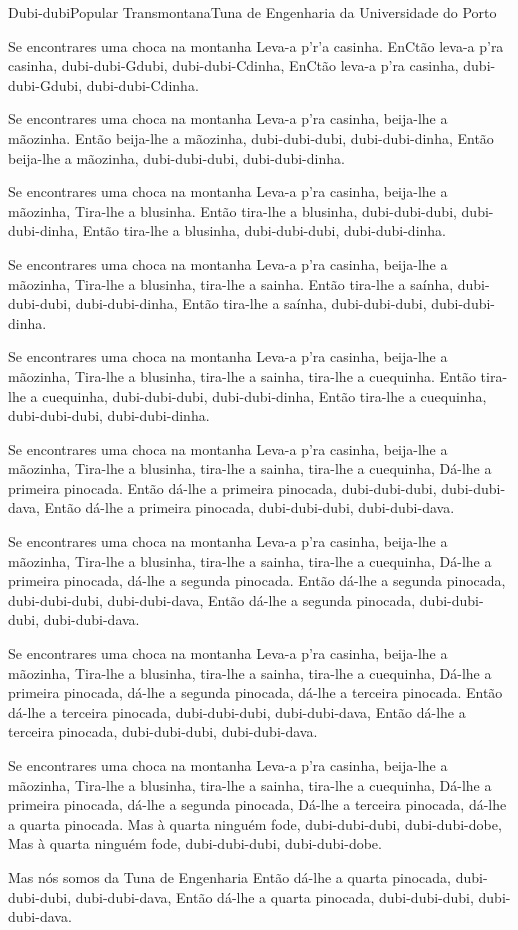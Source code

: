 \begin{musica}{Dubi-dubi}{Popular Transmontana}{Tuna de Engenharia da Universidade do Porto}

Se encontrares uma choca na montanha
Leva-a p'r'a casinha.
En\ac{C}{tão} leva-a p'ra casinha, dubi-dubi-\ac{G}{du}bi, dubi-dubi-\ac{C}{di}nha,
En\ac{C}{tão} leva-a p'ra casinha, dubi-dubi-\ac{G}{du}bi, dubi-dubi-\ac{C}{di}nha.

Se encontrares uma choca na montanha
Leva-a p'ra casinha, beija-lhe a mãozinha.
Então beija-lhe a mãozinha, dubi-dubi-dubi, dubi-dubi-dinha,
Então beija-lhe a mãozinha, dubi-dubi-dubi, dubi-dubi-dinha.

Se encontrares uma choca na montanha
Leva-a p'ra casinha, beija-lhe a mãozinha,
Tira-lhe a blusinha.
Então tira-lhe a blusinha, dubi-dubi-dubi, dubi-dubi-dinha,
Então tira-lhe a blusinha, dubi-dubi-dubi, dubi-dubi-dinha.

Se encontrares uma choca na montanha
Leva-a p'ra casinha, beija-lhe a mãozinha,
Tira-lhe a blusinha, tira-lhe a sainha.
Então tira-lhe a saínha, dubi-dubi-dubi, dubi-dubi-dinha,
Então tira-lhe a saínha, dubi-dubi-dubi, dubi-dubi-dinha.

Se encontrares uma choca na montanha
Leva-a p'ra casinha, beija-lhe a mãozinha,
Tira-lhe a blusinha, tira-lhe a sainha, tira-lhe a cuequinha.
Então tira-lhe a cuequinha, dubi-dubi-dubi, dubi-dubi-dinha,
Então tira-lhe a cuequinha, dubi-dubi-dubi, dubi-dubi-dinha.

Se encontrares uma choca na montanha
Leva-a p'ra casinha, beija-lhe a mãozinha,
Tira-lhe a blusinha, tira-lhe a sainha, tira-lhe a cuequinha,
Dá-lhe a primeira pinocada.
Então dá-lhe a primeira pinocada, dubi-dubi-dubi, dubi-dubi-dava,
Então dá-lhe a primeira pinocada, dubi-dubi-dubi, dubi-dubi-dava.

Se encontrares uma choca na montanha
Leva-a p'ra casinha, beija-lhe a mãozinha,
Tira-lhe a blusinha, tira-lhe a sainha, tira-lhe a cuequinha,
Dá-lhe a primeira pinocada, dá-lhe a segunda pinocada.
Então dá-lhe a segunda pinocada, dubi-dubi-dubi, dubi-dubi-dava,
Então dá-lhe a segunda pinocada, dubi-dubi-dubi, dubi-dubi-dava.

Se encontrares uma choca na montanha
Leva-a p'ra casinha, beija-lhe a mãozinha,
Tira-lhe a blusinha, tira-lhe a sainha, tira-lhe a cuequinha,
Dá-lhe a primeira pinocada, dá-lhe a segunda pinocada, dá-lhe a terceira pinocada.
Então dá-lhe a terceira pinocada, dubi-dubi-dubi, dubi-dubi-dava,
Então dá-lhe a terceira pinocada, dubi-dubi-dubi, dubi-dubi-dava.

Se encontrares uma choca na montanha
Leva-a p'ra casinha, beija-lhe a mãozinha,
Tira-lhe a blusinha, tira-lhe a sainha, tira-lhe a cuequinha,
Dá-lhe a primeira pinocada, dá-lhe a segunda pinocada,
Dá-lhe a terceira pinocada, dá-lhe a quarta pinocada.
Mas à quarta ninguém fode, dubi-dubi-dubi, dubi-dubi-dobe,
Mas à quarta ninguém fode, dubi-dubi-dubi, dubi-dubi-dobe.

Mas nós somos da Tuna de Engenharia
Então dá-lhe a quarta pinocada, dubi-dubi-dubi, dubi-dubi-dava,
Então dá-lhe a quarta pinocada, dubi-dubi-dubi, dubi-dubi-dava.

\end{musica}
